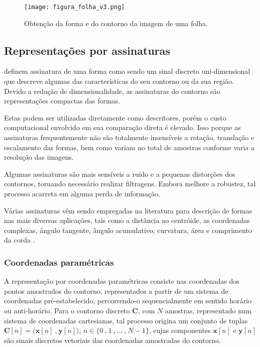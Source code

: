     

\begin{figure} 
\caption{\label{fig:folha_contorno1} Obtenção da forma e do contorno da imagem de uma folha.}
\texttt{[image: figura\_folha\_v3.png]}
\end{figure}

\subsection{\label{sec:Assinatura}Representações por assinaturas
}

 definem assinatura de uma forma como sendo um sinal discreto uni-dimensional que descreve algumas das características do seu contorno ou da sua região. Devido a redução de dimensionalidade, as assinaturas do contorno são representações compactas das formas. 

Estas podem ser utilizadas diretamente como descritores, porém o custo computacional envolvido em sua comparação direta é elevado. Isso porque as assinaturas frequentemente não são totalmente insensíveis a rotação, translação e escalamento das formas, bem como variam no total de amostras conforme varia a resolução das imagens. 

Algumas assinaturas são mais sensíveis a ruído e a pequenas distorções dos contornos, tornando necessário realizar filtragens. Embora melhore a robustez, tal processo acarreta em alguma perda de informação.

Várias assinaturas vêm sendo empregadas na literatura para descrição de formas nas mais diversas aplicações, tais como a distância ao centróide, as coordenadas complexas, ângulo tangente, ângulo acumulativo, curvatura, área e comprimento da corda \cite{Zhang:2004}.

\subsubsection{\label{sec:Rep_par}Coordenadas paramétricas}
A representação por coordenadas paramétricas consiste nas coordenadas dos pontos amostrados do contorno, representados a partir de um sistema de coordenadas pré-estabelecido, percorrendo-o sequencialmente em sentido horário ou anti-horário. Para o contorno discreto $\mathbf{C}$, com $N$ amostras, representado num sistema de coordenadas cartesianas, tal processo origina um conjunto de tuplas $\mathbf{C}[n] = \big(\mathbf{x}[n]\:\text{,}\:\mathbf{y}[n]\big)$, $n \in {\{0\:\text{,}\:1\:\text{,}\:\dotsc\:\text{,}\:N-1\}}$, cujas componentes $\mathbf{x}[n]$ e $\mathbf{y}[n]$ são sinais discretos vetoriais das coordenadas amostradas do contorno.

